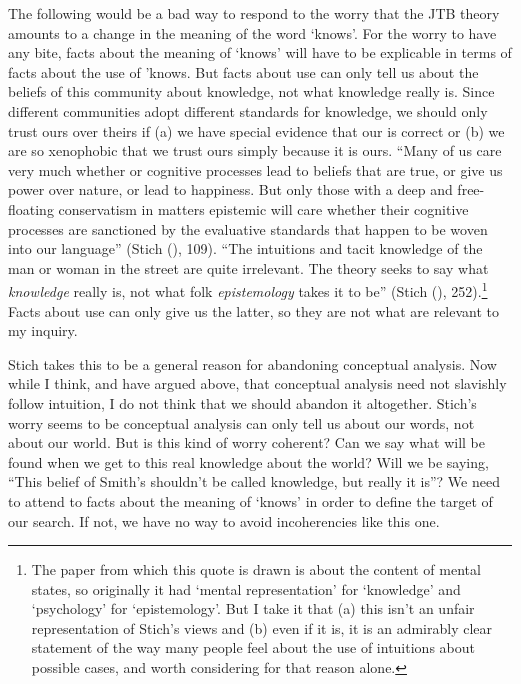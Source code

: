 \documentclass[
  11pt,
  letterpaper,
  DIV=11,
  numbers=noendperiod,
  twoside]{scrartcl}
\begin{document}
The following would be a bad way to respond to the worry that the JTB
theory amounts to a change in the meaning of the word `knows'. For the
worry to have any bite, facts about the meaning of `knows' will have to
be explicable in terms of facts about the use of 'knows. But facts about
use can only tell us about the beliefs of this community about
knowledge, not what knowledge really is. Since different communities
adopt different standards for knowledge, we should only trust ours over
theirs if (a) we have special evidence that our is correct or (b) we are
so xenophobic that we trust ours simply because it is ours. ``Many of us
care very much whether or cognitive processes lead to beliefs that are
true, or give us power over nature, or lead to happiness. But only those
with a deep and free-floating conservatism in matters epistemic will
care whether their cognitive processes are sanctioned by the evaluative
standards that happen to be woven into our language'' (Stich
(), 109). ``The intuitions and tacit
knowledge of the man or woman in the street are quite irrelevant. The
theory seeks to say what \emph{knowledge} really is, not what folk
\emph{epistemology} takes it to be'' (Stich
(), 252).\footnote{The paper from which
  this quote is drawn is about the content of mental states, so
  originally it had `mental representation' for `knowledge' and
  `psychology' for `epistemology'. But I take it that (a) this isn't an
  unfair representation of Stich's views and (b) even if it is, it is an
  admirably clear statement of the way many people feel about the use of
  intuitions about possible cases, and worth considering for that reason
  alone.} Facts about use can only give us the latter, so they are not
what are relevant to my inquiry.

Stich takes this to be a general reason for abandoning conceptual
analysis. Now while I think, and have argued above, that conceptual
analysis need not slavishly follow intuition, I do not think that we
should abandon it altogether. Stich's worry seems to be conceptual
analysis can only tell us about our words, not about our world. But is
this kind of worry coherent? Can we say what will be found when we get
to this real knowledge about the world? Will we be saying, ``This belief
of Smith's shouldn't be called knowledge, but really it is''? We need to
attend to facts about the meaning of `knows' in order to define the
target of our search. If not, we have no way to avoid incoherencies like
this one.
\end{document}
